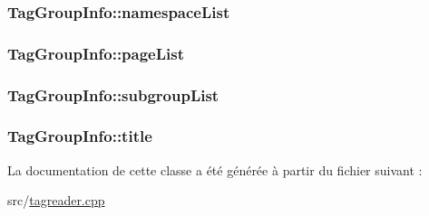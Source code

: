 \subsubsection[{namespace\+List}]{ Tag\+Group\+Info\+::namespace\+List}\label{class_tag_group_info_a475bde4c723d36e10c002b3293a3dbfc}
\hypertarget{class_tag_group_info_a4220d465d7554ad414359cd6425eebe4}{}
\subsubsection[{page\+List}]{ Tag\+Group\+Info\+::page\+List}\label{class_tag_group_info_a4220d465d7554ad414359cd6425eebe4}
\hypertarget{class_tag_group_info_aba982dd5a218d3d074fa84b6b7951051}{}
\subsubsection[{subgroup\+List}]{ Tag\+Group\+Info\+::subgroup\+List}\label{class_tag_group_info_aba982dd5a218d3d074fa84b6b7951051}
\hypertarget{class_tag_group_info_a985d71c6502715a18d431e87f70abd53}{}
\subsubsection[{title}]{ Tag\+Group\+Info\+::title}\label{class_tag_group_info_a985d71c6502715a18d431e87f70abd53}


La documentation de cette classe a été générée à partir du fichier suivant \+:\begin{DoxyCompactItemize}
\item 
src/\hyperlink{tagreader_8cpp}{tagreader.\+cpp}\end{DoxyCompactItemize}
